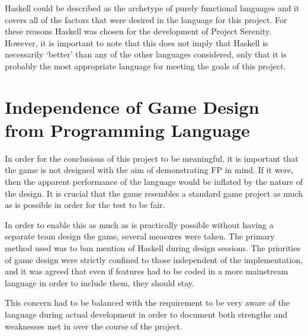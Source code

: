 Haskell could be described as the archetype of purely functional languages and it covers all of the factors that were desired in the language for this project. For these reasons Haskell was chosen for the development of Project Serenity. However, it is important to note that this does not imply that Haskell is necessarily `better' than any of the other languages considered, only that it is probably the most appropriate language for meeting the goals of this project.

\section{Independence of Game Design from Programming Language}

In order for the conclusions of this project to be meaningful, it is important that the game is not designed with the aim of demonstrating FP in mind. If it were, then the apparent performance of the language would be inflated by the nature of the design. It is crucial that the game resembles a standard game project as much as is possible in order for the test to be fair.

In order to enable this as much as is practically possible without having a separate team design the game, several measures were taken. The primary method used was to ban mention of Haskell during design sessions. The priorities of game design were strictly confined to those independent of the implementation, and it was agreed that even if features had to be coded in a more mainstream language in order to include them, they should stay. 

This concern had to be balanced with the requirement to be very aware of the language during actual development in order to document both strengths and weaknesses met in over the course of the project.

